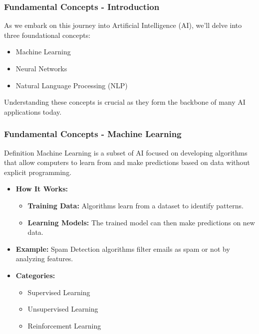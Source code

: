\documentclass[aspectratio=169]{beamer}
\begin{document}
\begin{frame}[fragile]
    \frametitle{Fundamental Concepts - Introduction}
    As we embark on this journey into Artificial Intelligence (AI), we'll delve into three foundational concepts:
    \begin{itemize}
        \item Machine Learning
        \item Neural Networks
        \item Natural Language Processing (NLP)
    \end{itemize}
    Understanding these concepts is crucial as they form the backbone of many AI applications today.
\end{frame}

\begin{frame}[fragile]
    \frametitle{Fundamental Concepts - Machine Learning}
    \begin{block}{Definition}
        Machine Learning is a subset of AI focused on developing algorithms that allow computers to learn from and make predictions based on data without explicit programming.
    \end{block}
    
    \begin{itemize}
        \item \textbf{How It Works:}
        \begin{itemize}
            \item \textbf{Training Data:} Algorithms learn from a dataset to identify patterns.
            \item \textbf{Learning Models:} The trained model can then make predictions on new data.
        \end{itemize}
        \item \textbf{Example:} Spam Detection algorithms filter emails as spam or not by analyzing features.
        \item \textbf{Categories:}
        \begin{itemize}
            \item Supervised Learning
            \item Unsupervised Learning
            \item Reinforcement Learning
        \end{itemize}
    \end{itemize}
\end{frame}
\end{document}
